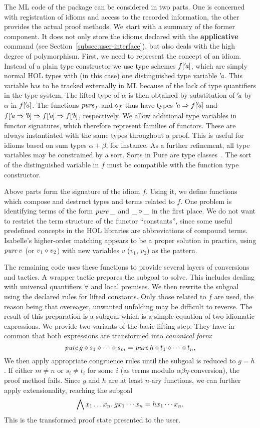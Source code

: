 The ML code of the package can be considered in two parts.
One is concerned with registration of idioms and access to the recorded
information, the other provides the actual proof methods.
We start with a summary of the former component.
It does not only store the idioms declared with the \textbf{applicative}
command (see Section~\ref{subsec:user-interface}), but also deals with the high
degree of polymorphism.
First, we need to represent the concept of an idiom.
Instead of a plain type constructor we use type schemes $f[{'\!\textit{a}}]$, which
are simply normal HOL types with (in this case) one distinguished type variable
${'\!\textit{a}}$.
This variable has to be tracked externally in ML because of the lack of
type quantifiers in the type system.
The lifted type of $\alpha$ is then obtained by substitution of ${'\!\textit{a}}$ by
$\alpha$ in $f[{'\!\textit{a}}]$.
The functions $\operatorname{\mathit{pure}}_f$ and $\diamond_f$ thus have types
${'\!\textit{a}} \Rightarrow f[{'\!\textit{a}}]$ and $f[{'\!\textit{a}} \Rightarrow {'\!\textit{b}}] \Rightarrow f[{'\!\textit{a}}] \Rightarrow f[{'\!\textit{b}}]$,
respectively.
We allow additional type variables in functor signatures, which therefore
represent families of functors.
These are always instantiated with the same types throughout a proof.
This is useful for idioms based on sum types $\alpha + \beta$, for instance.
As a further refinement, all type variables may be constrained by a sort.
Sorts in Pure are type classes~\cite{implementation-ref}.
The sort of the distinguished variable in $f$ must be compatible with the
function type constructor.

Above parts form the signature of the idiom $f$.
Using it, we define functions which compose and destruct types and terms
related to $f$.
One problem is identifying terms of the form $\operatorname{\mathit{pure}} \_$ and $\_ \diamond \_$ in
the first place.
We do not want to restrict the term structure of the functor ``constants'',
since some useful predefined concepts in the HOL libraries are abbreviations of
compound terms.
Isabelle's higher-order matching appears to be a proper solution in practice,
using $\operatorname{\mathit{pure}} v$ (or $v_1 \diamond v_2$) with new variables $v$ ($v_1$, $v_2$) as the
pattern.

The remaining code uses these functions to provide several layers of
conversions and tactics.
A wrapper tactic prepares the subgoal to solve.
This includes dealing with universal quantifiers $\forall$ and local premises.
We then rewrite the subgoal using the declared rules for lifted constants.
Only those related to $f$ are used, the reason being that overeager, unwanted
unfolding may be difficult to reverse.
The result of this preparation is a subgoal which is a simple equation of two
idiomatic expressions.
We provide two variants of the basic lifting step.
They have in common that both expressions are transformed into \emph{canonical form}:
\[ \operatorname{\mathit{pure}}{g} \diamond s_1 \diamond \cdots \diamond s_m = \operatorname{\mathit{pure}}{h} \diamond t_1 \diamond \cdots \diamond t_n, \]
We then apply appropriate congruence rules until the subgoal is reduced to $g = h$.
If either $m \ne n$ or $s_i \ne t_i$ for some $i$ (as terms modulo
$\alpha\beta\eta$-conversion), the proof method fails.
Since $g$ and $h$ are at least $n$-ary functions, we can further apply
extensionality, reaching the subgoal
\[ \bigwedge x_1 \dots x_n.\>g x_1 \cdots x_n = h x_1 \cdots x_n. \]
This is the transformed proof state presented to the user.

